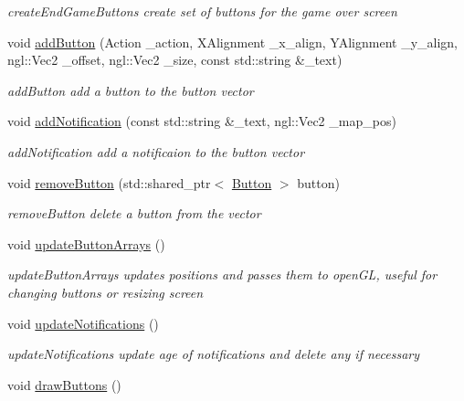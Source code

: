 \begin{DoxyCompactItemize}
\begin{DoxyCompactList}\small\item\em create\+End\+Game\+Buttons create set of buttons for the game over screen \end{DoxyCompactList}\item 
void \hyperlink{class_gui_a4b0fe96dae38c2ed21254d485cc44f8a}{add\+Button} (Action \+\_\+action, X\+Alignment \+\_\+x\+\_\+align, Y\+Alignment \+\_\+y\+\_\+align, ngl\+::\+Vec2 \+\_\+offset, ngl\+::\+Vec2 \+\_\+size, const std\+::string \&\+\_\+text)
\begin{DoxyCompactList}\small\item\em add\+Button add a button to the button vector \end{DoxyCompactList}\item 
void \hyperlink{class_gui_a40c1d90297aba24deeee87be41766856}{add\+Notification} (const std\+::string \&\+\_\+text, ngl\+::\+Vec2 \+\_\+map\+\_\+pos)
\begin{DoxyCompactList}\small\item\em add\+Notification add a notificaion to the button vector \end{DoxyCompactList}\item 
void \hyperlink{class_gui_a95012bb614a2cc32f18bf8ecd29019ef}{remove\+Button} (std\+::shared\+\_\+ptr$<$ \hyperlink{class_button}{Button} $>$ button)
\begin{DoxyCompactList}\small\item\em remove\+Button delete a button from the vector \end{DoxyCompactList}\item 
\hypertarget{class_gui_ad611c7f7b5cac900229fcfef4c090166}{}void \hyperlink{class_gui_ad611c7f7b5cac900229fcfef4c090166}{update\+Button\+Arrays} ()\label{class_gui_ad611c7f7b5cac900229fcfef4c090166}

\begin{DoxyCompactList}\small\item\em update\+Button\+Arrays updates positions and passes them to open\+G\+L, useful for changing buttons or resizing screen \end{DoxyCompactList}\item 
\hypertarget{class_gui_a649d94eae69852d92b59861c774287c4}{}void \hyperlink{class_gui_a649d94eae69852d92b59861c774287c4}{update\+Notifications} ()\label{class_gui_a649d94eae69852d92b59861c774287c4}

\begin{DoxyCompactList}\small\item\em update\+Notifications update age of notifications and delete any if necessary \end{DoxyCompactList}\item 
\hypertarget{class_gui_a31d2eaddba4843354b0db41a05197d47}{}void \hyperlink{class_gui_a31d2eaddba4843354b0db41a05197d47}{draw\+Buttons} ()\label{class_gui_a31d2eaddba4843354b0db41a05197d47}


\end{DoxyCompactItemize}

